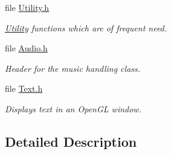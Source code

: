 \begin{DoxyCompactItemize}
file \hyperlink{_utility_8h}{Utility.\-h}
\begin{DoxyCompactList}\small\item\em \hyperlink{namespace_utility}{Utility} functions which are of frequent need. \end{DoxyCompactList}\item 
file \hyperlink{_audio_8h}{Audio.\-h}
\begin{DoxyCompactList}\small\item\em Header for the music handling class. \end{DoxyCompactList}\item 
file \hyperlink{_text_8h}{Text.\-h}
\begin{DoxyCompactList}\small\item\em Displays text in an Open\-G\-L window. \end{DoxyCompactList}\end{DoxyCompactItemize}


\subsection{Detailed Description}

